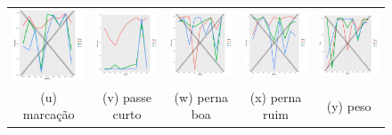 \documentclass[review]{elsarticle}
\begin{document}
\begin{figure}
\begin{tabular}{ccccc}
   \includegraphics[width=25mm]{marcacao_result_trans_media} & \includegraphics[width=25mm]{passecurto_result_trans_media}   &   \includegraphics[width=25mm]{pernaboa_result_trans_media}&
  \includegraphics[width=25mm]{pernaruim_result_trans_media}   & \includegraphics[width=25mm]{peso_result_trans_media}   \\
 \scriptsize{(u) marcação} & \scriptsize{(v) passe curto } & \scriptsize{(w) perna boa} & \scriptsize{(x) perna ruim} & \scriptsize{(y) peso}\\[3pt]
 

\end{tabular}
\end{figure}
\end{document}
